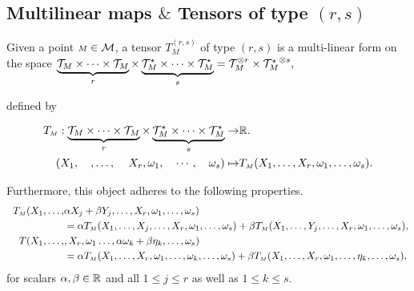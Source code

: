 \subsection{Multilinear maps $\&$ Tensors of type $(r,s)$}
\begin{definition}
Given a point ${\scriptstyle M}\in \mathcal{M}$, a tensor $T^{(r,s)}_{\scriptscriptstyle M}$ of type $(r,s)$ is a multi-linear form on the space
$\underbrace{ \mathcal{T}_{\scriptstyle M}\times \dots \times \mathcal{T}_{\scriptstyle M}}_{r}\times \underbrace{\mathcal{T}_{\scriptstyle M}^\star \times\dots \times \mathcal{T}_{\scriptstyle M}^\star }_{s}= \mathcal{T}_{\scriptstyle M}^{\otimes r}\times  {\mathcal{T}_{\scriptstyle M}^\star}^{\otimes s},$

defined by

\begin{align*}
T_{\scriptscriptstyle M}:\underbrace{ \mathcal{T}_{\scriptstyle M}\times \dots \times \mathcal{T}_{\scriptstyle M} }_{r}\times \underbrace{\mathcal{T}_{\scriptstyle M}^\star \times\dots \times \mathcal{T}_{\scriptstyle M}^\star }_{s}\to & \mathbb{R}.\\
(X_{1},\quad, \dots,\quad \, X_{r}, \omega_{1},\quad\cdots,\quad\omega_{s})\mapsto & T_{\scriptscriptstyle M}(X_{1},\dots, X_{r},\omega_{1},\dots,\omega_{s}).\\
\end{align*}

Furthermore, this object adheres to the following properties. 
 \[
\begin{aligned} 
\hspace{.2cm}T_{\scriptscriptstyle M}(X_{1},\dots,&\alpha X_{j}+ \beta Y_{j},\dots, X_{r},\omega_{1},\dots,\omega_{s})\\&=
\alpha T_{\scriptscriptstyle M}(X_{1},\dots, X_{j},\dots, X_{r},\omega_{1},\dots,\omega_{s})+\beta T_{\scriptscriptstyle M}(X_{1},\dots, Y_{j},\dots, X_{r},\omega_{1},\dots,\omega_{s}),\\
\hspace{.2cm}T(X_{1},\dots,&, X_{r},\omega_{1}\dots,\alpha\omega_{k}+\beta \eta_{k},\dots,\omega_{s})\\&=
\alpha T_{\scriptscriptstyle M}(X_{1},\dots, X_{r},\omega_{1},\dots,\omega_{k},\dots,\omega_{s})+\beta T_{\scriptscriptstyle M}(X_{1},\dots,  X_{r},\omega_{1},\dots,\eta_{k},\dots,\omega_{s}),\\
\end{aligned}\]
for scalars $\alpha,\beta \in \mathbb{R}$ and all $1\leq j\leq r$ as well as $1\leq k\leq s$.


\end{definition}

